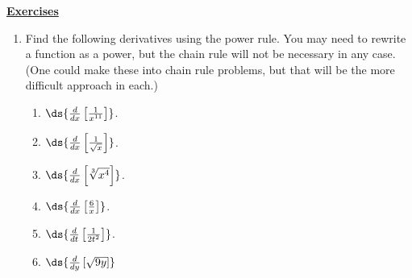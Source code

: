 \begin{center}\underline{\Large{\bf Exercises}}\end{center}
\bigskip
\begin{multicols}{2}
\begin{enumerate}
\item Find the following derivatives using the power rule.
You may need to rewrite a function as a power, but the
chain rule will not be necessary in any case.
(One could make these into chain rule problems, but 
that will be the more difficult approach in each.)
\begin{enumerate}
\item $\ds{\frac{d}{dx}\left[\frac1{x^{11}}\right]}$.
\item $\ds{\frac{d}{dx}\left[\frac1{\sqrt{x}}\right]}$.
\item $\ds{\frac{d}{dx}\left[\sqrt[3]{x^4}\right]}$.
\item $\ds{\frac{d}{dx}\left[\frac{6}{x}\right]}$.
\item $\ds{\frac{d}{dt}\left[\frac1{2t^2}\right]}$.
\item $\ds{\frac{d}{dy}\left[\sqrt{9y}\right]}$
\end{enumerate}


\end{enumerate}
\end{multicols}
